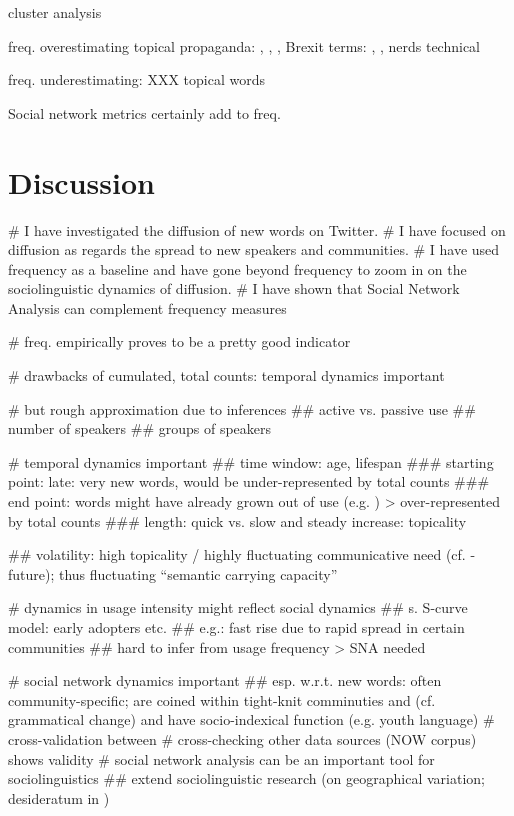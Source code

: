 \documentclass[
  a4paper,
  abstract=on,
  captions=tableabove
  ]{scrartcl}
\begin{document}
  cluster analysis

  freq. overestimating
  topical
  propaganda: , , , 
  Brexit terms: , , 
  nerds
  technical

  freq. underestimating: XXX
  topical words

  Social network metrics certainly add to freq.

\section{Discussion}
  \label{sec:discussion}


    \begin{qitem}
      # I have investigated the diffusion of new words on Twitter.
      # I have focused on diffusion as regards the spread to new speakers and communities.
      # I have used frequency as a baseline and have gone beyond frequency to zoom in on the sociolinguistic dynamics of diffusion.
      # I have shown that Social Network Analysis can complement frequency measures
    \end{qitem}


    \begin{qitem}
      # freq. empirically proves to be a pretty good indicator

      # drawbacks of cumulated, total counts: temporal dynamics important

      # but rough approximation due to inferences
        ## active vs. passive use
        ## number of speakers
        ## groups of speakers

      # temporal dynamics important
        ## time window: age, lifespan
          ### starting point: late: very new words, would be under-represented by total counts
          ### end point: words might have already grown out of use (e.g. ) > over-represented by total counts
          ### length: quick vs. slow and steady increase: topicality

        ## volatility: high topicality / highly fluctuating communicative need (cf. -future); thus fluctuating ``semantic carrying capacity''~\parencite{Grieve2018MappingLexical}

      # dynamics in usage intensity might reflect social dynamics
        ## s. S-curve model: early adopters etc.
        ## e.g.: fast rise due to rapid spread in certain communities
        ## hard to infer from usage frequency > SNA needed

      # social network dynamics important
        ## esp. w.r.t. new words: often community-specific; are coined within tight-knit comminuties and (cf. grammatical change) and have socio-indexical function (e.g. youth language)
      # cross-validation between
      # cross-checking other data sources (NOW corpus) shows validity
      # social network analysis can be an important tool for sociolinguistics
        ## extend sociolinguistic research (on geographical variation; desideratum in \cite{Grieve2019MappingLexical})
    \end{qitem}
\end{document}
